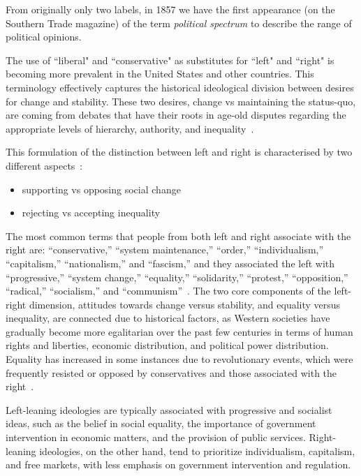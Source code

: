 From originally only two labels, in 1857 we have the first appearance (on the Southern Trade magazine) of the term \emph{political spectrum} to describe the range of political opinions.


The use of ``liberal" and ``conservative" as substitutes for ``left" and ``right" is becoming more prevalent in the United States and other countries.
This terminology effectively captures the historical ideological division between desires for change and stability.
These two desires, change vs maintaining the status-quo, are coming from debates that have their roots in age-old disputes regarding the appropriate levels of hierarchy, authority, and inequality~\citep{bobbio1996left}.


This formulation of the distinction between left and right is characterised by
two different aspects~\citep{jost2018political}:
\begin{itemize}
    \item supporting vs opposing social change
    \item rejecting vs accepting inequality
\end{itemize}
The most common terms that people from both left and right associate with the right are: “conservative,” “system maintenance,” “order,” “individualism,” “capitalism,” “nationalism,” and “fascism,” and they associated the left with “progressive,” “system change,” “equality,” “solidarity,” “protest,” “opposition,” “radical,” “socialism,” and “communism”~\citep[p.~213-14]{fuchs1990}.
The two core components of the left-right dimension, attitudes towards change versus stability, and equality versus inequality, are connected due to historical factors, as Western societies have gradually become more egalitarian over the past few centuries in terms of human rights and liberties, economic distribution, and political power distribution.
Equality has increased in some instances due to revolutionary events, which were frequently resisted or opposed by conservatives and those associated with the right~\citep{nosek2009politics,burke1790reflections}.



Left-leaning ideologies are typically associated with progressive and socialist ideas, such as the belief in social equality, the importance of government intervention in economic matters, and the provision of public services.
Right-leaning ideologies, on the other hand, tend to prioritize individualism, capitalism, and free markets, with less emphasis on government intervention and regulation.

